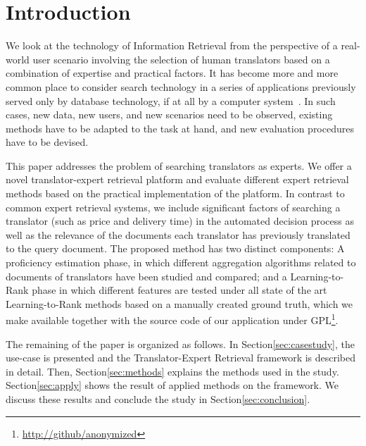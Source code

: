 \section{Introduction}
\label{sec:introduction}
We look at the technology of Information Retrieval from the perspective of a real-world user scenario involving the selection of human translators based on a combination of expertise and practical factors. 
It has become more and more common place to consider search technology in a series of applications previously served only by database technology, if at all by a computer system~\cite{Grefenstette:2011}. In such cases, new data, new users, and new scenarios need to be observed, existing methods have to be adapted to the task at hand, and new evaluation procedures have to be devised. 

This paper addresses the problem of searching translators as experts. We offer a novel translator-expert retrieval platform and evaluate different expert retrieval methods based on the practical implementation of the platform. In contrast to common expert retrieval systems, we include significant factors of searching a translator (such as price and delivery time) in the automated decision process as well as the relevance of the documents each translator has previously translated to the query document. The proposed method has two distinct components: A proficiency estimation phase, in which different aggregation algorithms related to documents of translators have been studied and compared; and a Learning-to-Rank phase in which different features are tested under all state of the art Learning-to-Rank methods based on a manually created ground truth, which we make available together with the source code of our application under GPL\footnote{\url{http://github/anonymized}}. 

The remaining of the paper is organized as follows. In Section\ref{sec:casestudy}, the use-case is presented and the Translator-Expert Retrieval framework is described in detail. Then, Section\ref{sec:methods} explains the methods used in the study. Section\ref{sec:apply} shows the result of applied methods on the framework. We discuss these results and conclude the study in Section\ref{sec:conclusion}.
